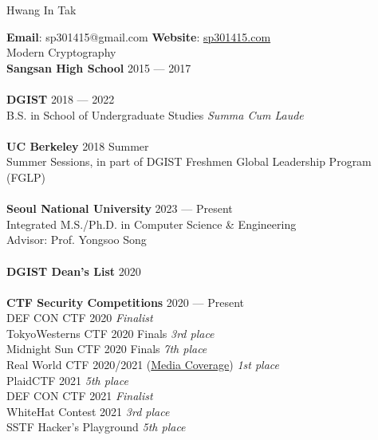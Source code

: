 


{\Huge Hwang In Tak} \hfill

\vspace{0.5cm}

\textbf{Email}: sp301415@gmail.com \hspace{0.5cm} \textbf{Website}: \href{https://sp301415.com}{sp301415.com} \\

Modern Cryptography \\

\textbf{Sangsan High School} \hfill 2015 --- 2017 \\
\\
\textbf{DGIST} \hfill 2018 --- 2022 \\
B.S. in School of Undergraduate Studies \hfill \textit{Summa Cum Laude} \\
\\
\textbf{UC Berkeley} \hfill 2018 Summer \\
Summer Sessions, in part of DGIST Freshmen Global Leadership Program (FGLP) \\
\\
\textbf{Seoul National University} \hfill 2023 --- Present \\
Integrated M.S./Ph.D. in Computer Science \& Engineering \\
Advisor: Prof. Yongsoo Song \\
\\

\textbf{DGIST Dean's List} \hfill 2020 \\
\\
\textbf {CTF Security Competitions} \hfill 2020 --- Present \\
DEF CON CTF 2020 \hfill \textit{Finalist} \\
TokyoWesterns CTF 2020 Finals \hfill \textit{3rd place} \\
Midnight Sun CTF 2020 Finals \hfill \textit{7th place} \\
Real World CTF 2020/2021 (\href{https://www.boannews.com/media/view.asp?idx=94063}{Media Coverage})  \hfill \textit{1st place} \\
PlaidCTF 2021 \hfill \textit{5th place} \\
DEF CON CTF 2021 \hfill \textit{Finalist} \\
WhiteHat Contest 2021 \hfill \textit{3rd place} \\
SSTF Hacker's Playground \hfill \textit{5th place} \\

